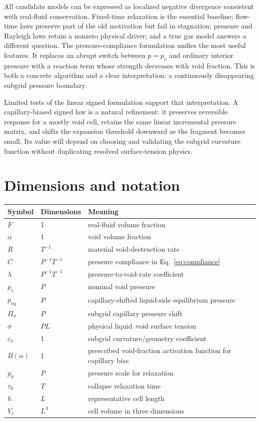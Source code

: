 \documentclass[11pt]{article}
\begin{document}
All candidate models can be expressed as localized negative divergence consistent with
real-fluid conservation.  Fixed-time relaxation is the essential baseline; flow-time
laws preserve part of the old motivation but fail in stagnation; pressure and Rayleigh
laws retain a nonzero physical driver; and a true gas model answers a different question.
The pressure-compliance formulation unifies the most useful features.  It replaces an
abrupt switch between \(p=p_v\) and ordinary interior pressure with a reaction term whose
strength decreases with void fraction.  This is both a concrete algorithm and a clear
interpretation: a continuously disappearing subgrid pressure boundary.

Limited tests of the linear signed formulation support that interpretation.  A
capillary-biased signed law is a natural refinement: it preserves reversible response
for a mostly void cell, retains the same linear incremental pressure matrix, and shifts
the expansion threshold downward as the fragment becomes small.  Its value will depend
on choosing and validating the subgrid curvature function without duplicating resolved
surface-tension physics.

\appendix
\section{Dimensions and notation}

\begin{table}[htbp]
\centering
\small
\begin{tabularx}{\textwidth}{@{}p{}p{}X@{}}
\toprule
Symbol & Dimensions & Meaning \\
\midrule
\(F\) & 1 & real-fluid volume fraction \\
\(\alpha\) & 1 & void volume fraction \\
\(R\) & \(T^{-1}\) & material void-destruction rate \\
\(C\) & \(P^{-1}T^{-1}\) & pressure compliance in Eq.~\eqref{eq:compliance} \\
\(\lambda\) & \(P^{-1}T^{-1}\) & pressure-to-void-rate coefficient \\
\(p_v\) & \(P\) & nominal void pressure \\
\(p_{\mathrm{eq}}\) & \(P\) & capillary-shifted liquid-side equilibrium pressure \\
\(\Pi_\sigma\) & \(P\) & subgrid capillary pressure shift \\
\(\sigma\) & \(PL\) & physical liquid--void surface tension \\
\(c_\sigma\) & 1 & subgrid curvature/geometry coefficient \\
\(B(\alpha)\) & 1 & prescribed void-fraction activation function for capillary bias \\
\(p_0\) & \(P\) & pressure scale for relaxation \\
\(\tau_0\) & \(T\) & collapse relaxation time \\
\(h\) & \(L\) & representative cell length \\
\(V_c\) & \(L^3\) & cell volume in three dimensions \\
\bottomrule
\end{tabularx}
\end{table}
\end{document}
